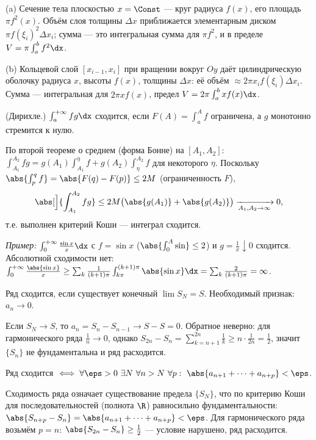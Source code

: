 \dok (a) Сечение тела плоскостью $x=\Const$ — круг радиуса $f(x)$, его площадь $\pi f^2(x)$. Объём
слоя толщины $\Delta x$ приближается элементарным диском $\pi f(\xi_i)^2\Delta x_i$; сумма — это
интегральная сумма для $\pi f^2$, и в пределе $V=\pi\int_a^b f^2\dx$.

(b) Кольцевой слой $[x_{i-1},x_i]$ при вращении вокруг $Oy$ даёт цилиндрическую оболочку радиуса
$x$, высоты $f(x)$, толщины $\Delta x$: её объём $\approx2\pi x_i f(\xi_i)\Delta x_i$. Сумма —
интегральная для $2\pi x f(x)$, предел $V=2\pi\int_a^b x f(x)\dx$.

\stmt (Дирихле.) $\int_a^{+\infty}f g\dx$ сходится, если $F(A)=\int_a^A f$ ограничена, а $g$
монотонно стремится к нулю.

\dok По второй теореме о среднем (форма Бонне) на $[A_1,A_2]$:
$\int_{A_1}^{A_2}fg=g(A_1)\int_{A_1}^{\eta}f+g(A_2)\int_{\eta}^{A_2}f$ для некоторого $\eta$.
Поскольку $\abs{\int_{p}^{q}f}=\abs{F(q)-F(p)}\le2M$ (ограниченность $F$),
\[
  \abs[\Big]{\int_{A_1}^{A_2}fg}\le2M\bigl(\abs{g(A_1)}+\abs{g(A_2)}\bigr)\xrightarrow[A_1,A_2\to\infty]{}0,
\]
т.е. выполнен критерий Коши — интеграл сходится.

\emph{Пример:} $\int_0^{+\infty}\tfrac{\sin x}{x}\dx$
с $f=\sin x$ ($\abs{\int_0^A\sin}\le2$) и $g=\tfrac1x\downarrow0$ сходится. Абсолютной сходимости
нет: $\int_0^{+\infty}\tfrac{\abs{\sin x}}{x}\ge\sum_{k}\tfrac1{(k+1)\pi}\int_{k\pi}^{(k+1)\pi}\abs{\sin x}\dx
=\sum_k\tfrac{2}{(k+1)\pi}=\infty$.

\stmt Ряд сходится, если существует конечный $\lim S_N=S$. Необходимый признак: $a_n\to0$.

\dok Если $S_N\to S$, то $a_n=S_n-S_{n-1}\to S-S=0$. Обратное неверно: для гармонического ряда
$\tfrac1n\to0$, однако
$S_{2n}-S_n=\sum_{k=n+1}^{2n}\tfrac1k\ge n\cdot\tfrac1{2n}=\tfrac12$, значит $\{S_n\}$ не
фундаментальна и ряд расходится.

\stmt Ряд сходится $\iff\forall\eps>0\ \exists N\ \forall n>N\ \forall p:\
\abs{a_{n+1}+\dots+a_{n+p}}<\eps$.

\dok Сходимость ряда означает существование предела $\{S_N\}$, что по критерию Коши для
последовательностей (полнота $\R$) равносильно фундаментальности:
$\abs{S_{n+p}-S_n}=\abs{a_{n+1}+\dots+a_{n+p}}<\eps$. Для гармонического ряда возьмём $p=n$:
$\abs{S_{2n}-S_n}\ge\tfrac12$ — условие нарушено, ряд расходится.

